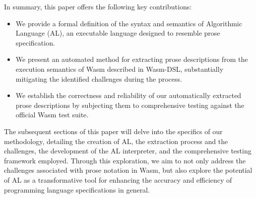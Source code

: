 In summary, this paper offers the following key contributions:

\begin{itemize}
\item We provide a formal definition of the syntax and semantics of
Algorithmic Language (AL), an executable language designed to resemble prose
specification.
\item We present an automated method for extracting prose descriptions from
the execution semantics of Wasm described in Wasm-DSL, substantially mitigating
the identified challenges during the process.
\item We establish the correctness and reliability of our automatically
extracted prose descriptions by subjecting them to comprehensive testing
against the official Wasm test suite.
\end{itemize}

The subsequent sections of this paper will delve into the specifics of our
methodology, detailing the creation of AL, the extraction process and the
challenges, the development of the AL interpreter, and the comprehensive
testing framework employed. Through this exploration, we aim to not only
address the challenges associated with prose notation in Wasm, but also explore
the potential of AL as a transformative tool for enhancing the accuracy and
efficiency of programming language specifications in general.
